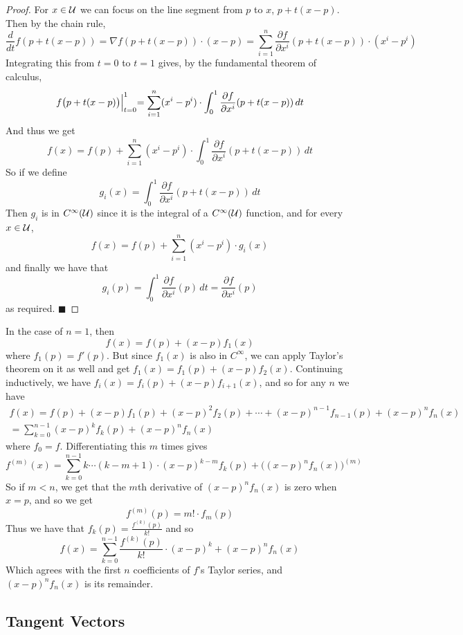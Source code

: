 \documentclass[10pt]{article}
\def\mU{{\cal U}}
\def\qed{%
    \ifmmode%
        \eqno\blacksquare%
    \else%
        \hskip1cm\allowbreak\hbox{}\nobreak\hfill$\blacksquare$%
    \fi%
}
\begin{document}
\begin{proof}

    For $x\in\mU$ we can focus on the line segment from $p$ to $x$, $p+t(x-p)$.
    Then by the chain rule,
    \[ \frac d{dt}f(p+t(x-p)) = \nabla f(p+t(x-p))\cdot(x-p) = \sum_{i=1}^n \frac{\partial f}{\partial x^i}(p+t(x-p))\cdot(x^i-p^i) \]
    Integrating this from $t=0$ to $t=1$ gives, by the fundamental theorem of calculus,
    \[ f\bigl(p+t(x-p)\bigr)\Bigl|_{t=0}^1 = \sum_{i=1}^n (x^i-p^i)\cdot\int_0^1\frac{\partial f}{\partial x^i}(p+t(x-p))\,dt \]
    And thus we get
    \[ f(x) = f(p) + \sum_{i=1}^n (x^i-p^i)\cdot\int_0^1\frac{\partial f}{\partial x^i}(p+t(x-p))\,dt \]
    So if we define
    \[ g_i(x) = \int_0^1\frac{\partial f}{\partial x^i}(p+t(x-p))\,dt \]
    Then $g_i$ is in $C^\infty(\mU)$ since it is the integral of a $C^\infty(\mU)$ function, and for every $x\in\mU$,
    \[ f(x) = f(p) + \sum_{i=1}^n (x^i-p^i)\cdot g_i(x) \]
    and finally we have that
    \[ g_i(p) = \int_0^1 \frac{\partial f}{\partial x^i}(p)\,dt = \frac{\partial f}{\partial x^i}(p) \]
    as required.
    \qed

\end{proof}

In the case of $n=1$, then
\[ f(x) = f(p) + (x-p)f_1(x) \]
where $f_1(p)=f'(p)$.
But since $f_1(x)$ is also in $C^\infty$, we can apply Taylor's theorem on it as well and get $f_1(x)=f_1(p)+(x-p)f_2(x)$.
Continuing inductively, we have $f_i(x)=f_i(p)+(x-p)f_{i+1}(x)$, and so for any $n$ we have
\begin{multline*}
    f(x) = f(p) + (x-p)f_1(p) + (x-p)^2f_2(p) + \cdots + (x-p)^{n-1}f_{n-1}(p) + (x-p)^nf_n(x) 
    \\= \sum_{k=0}^{n-1} (x-p)^kf_k(p) + (x-p)^nf_n(x)
\end{multline*}
where $f_0=f$.
Differentiating this $m$ times gives
\[ f^{(m)}(x) = \sum_{k=0}^{n-1} k\cdots(k-m+1)\cdot(x-p)^{k-m}f_k(p) + \bigl((x-p)^nf_n(x)\bigr)^{(m)} \]
So if $m<n$, we get that the $m$th derivative of $(x-p)^nf_n(x)$ is zero when $x=p$, and so we get
\[ f^{(m)}(p) = m!\cdot f_m(p) \]
Thus we have that $f_k(p)=\frac{f^{(k)}(p)}{k!}$ and so
\[ f(x) = \sum_{k=0}^{n-1} \frac{f^{(k)}(p)}{k!}\cdot(x-p)^k + (x-p)^nf_n(x) \]
Which agrees with the first $n$ coefficients of $f$'s Taylor series, and $(x-p)^nf_n(x)$ is its remainder.

\subsection{Tangent Vectors}
\end{document}
